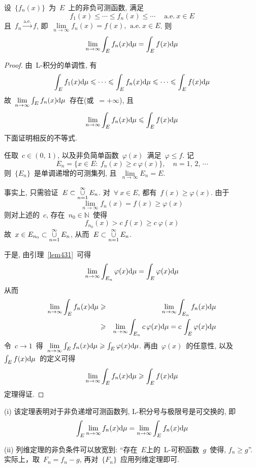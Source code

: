 \begin{theorem}
设~$\{f_n(x)\}$~为~$E$~上的非负可测函数, 满足
\[
f_1(x) \leqslant \cdots \leqslant f_n(x) \leqslant \cdots \quad \mathrm{~a.e.~} x \in E
\]
且~$f_n \xrightarrow{\mathrm{a.e.}} f$, 即~$\lim\limits_{n \to \infty} f_n(x) = f(x),\, \mathrm{~a.e.~} x \in E$. 则
\[
\lim_{n \to \infty} \int_E f_n(x) \mathrm{d} \mu = \int_E f(x) \mathrm{d} \mu
\]
\end{theorem}

\begin{proof}
由~L-积分的单调性, 有
\[
\int_E f_1(x) \mathrm{d} \mu \leqslant \cdots \leqslant \int_E f_n(x) \mathrm{d} \mu \leqslant \cdots \leqslant \int_E f(x) \mathrm{d} \mu
\]
故~$\lim\limits_{n \to \infty} \int_E f_n(x) \mathrm{d} \mu$~存在(或~$=+\infty$), 且
\[
\lim_{n \to \infty} \int_E f_n(x) \mathrm{d} \mu \leqslant \int_E f(x) \mathrm{d} \mu
\]
下面证明相反的不等式.

任取~$c \in (0,\, 1)$, 以及非负简单函数~$\varphi(x)$~满足~$\varphi \leqslant f$. 记
\[
E_n = \{x \in E: \: f_n(x) \geqslant c ~\! \varphi(x)\}, \quad  n = 1,\, 2,\, \cdots
\]
则~$\{E_n\}$~是单调递增的可测集列, 且~$\lim\limits_{n \to \infty} E_n = E$.

事实上, 只需验证~$E \subset \mathop{\mathop{\cup}}\limits_{n=1}^\infty E_n$. 对~$\forall~x \in E$, 都有~$f(x) \geqslant \varphi(x)$. 由于
\[
\lim_{n \to \infty} f_n(x) = f(x) \geqslant \varphi(x)
\]
则对上述的~$c$, 存在~$n_0 \in \mathbb{N}$~使得
\[
f_{n_0}(x) > c ~\! f(x) \geqslant c ~\! \varphi(x)
\]
故~$x \in E_{n_0} \subset \mathop{\mathop{\cup}}\limits_{n=1}^\infty E_{n}$, 从而~$E \subset \mathop{\mathop{\cup}}\limits_{n=1}^\infty E_{n}$.

\vspace*{0.2cm}

于是, 由引理~\ref{lem431}~可得
\[
\lim_{n \to \infty} \int_{E_n} \varphi(x) \mathrm{d} \mu = \int_E \varphi(x) \mathrm{d} \mu
\]
从而
\begin{eqnarray*}
\lim_{n \to \infty} \int_E f_n(x) \mathrm{d} \mu &\geqslant& \lim_{n \to \infty} \int_{E_n} f_n(x) \mathrm{d} \mu \\
&\geqslant& \lim_{n \to \infty} \int_{E_n} c ~\! \varphi(x) \mathrm{d} \mu = c ~\! \int_E \varphi(x) \mathrm{d} \mu
\end{eqnarray*}
令~$c \to 1$~得~$\lim\limits_{n \to \infty} \int_E f_n(x) \mathrm{d} \mu \geqslant \int_E \varphi(x) \mathrm{d} \mu$. 再由~$\varphi(x)$~的任意性, 以及~$\int_E f(x) \mathrm{d} \mu$~的定义可得
\[
\lim_{n \to \infty} \int_E f_n(x) \mathrm{d} \mu \geqslant \int_E f(x) \mathrm{d} \mu
\]
定理得证.
\end{proof}

\begin{remark}
(i) 该定理表明对于非负递增可测函数列, L-积分号与极限号是可交换的, 即
\[
\int_E \lim_{n \to \infty} f_n(x) \mathrm{d} \mu = \lim_{n \to \infty} \int_E f_n(x) \mathrm{d} \mu
\]

(ii) 列维定理的非负条件可以放宽到: ``存在~$E$上的~L-可积函数~$g$~使得, $f_n \geq g$''. 实际上，取~$F_n=f_n-g$, 再对~$\{F_n\}$~应用列维定理即可.
\end{remark}

